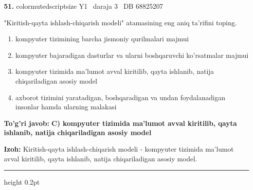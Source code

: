 \documentclass[10pt,a4paper,oneside]{article}
\begin{document}
\noindent\textbf{\color{ink}51.}  {color{muted}scriptsize Y1 \textbullet\ daraja 3 \textbullet\ DB 68825207}
\par
"Kiritish-qayta ishlash-chiqarish modeli" atamasining eng aniq ta'rifini toping.
\begin{enumerate}[label=\Alph*),leftmargin=9mm]
\item kompyuter tizimining barcha jismoniy qurilmalari majmui
\item kompyuter bajaradigan dasturlar va ularni boshqaruvchi ko'rsatmalar majmui
\item kompyuter tizimida ma'lumot avval kiritilib, qayta ishlanib, natija chiqariladigan asosiy model
\item axborot tizimini yaratadigan, boshqaradigan va undan foydalanadigan insonlar hamda ularning malakasi
\end{enumerate}
\begin{tcolorbox}[enhanced,breakable,colback=teal!4,colframe=teal!50!black,boxrule=0.5pt,arc=1.1mm,left=3mm,right=3mm,top=1.7mm,bottom=1.7mm,before skip=2mm,after skip=2mm]
\textbf{\color{teal}To'g'ri javob:} \textbf{C) kompyuter tizimida ma'lumot avval kiritilib, qayta ishlanib, natija chiqariladigan asosiy model}
\par\smallskip
\textbf{Izoh:} Kiritish-qayta ishlash-chiqarish modeli - kompyuter tizimida ma'lumot avval kiritilib, qayta ishlanib, natija chiqariladigan asosiy model.
\end{tcolorbox}
\vspace{2mm}\hrule height 0.2pt \vspace{3mm}
\end{document}
